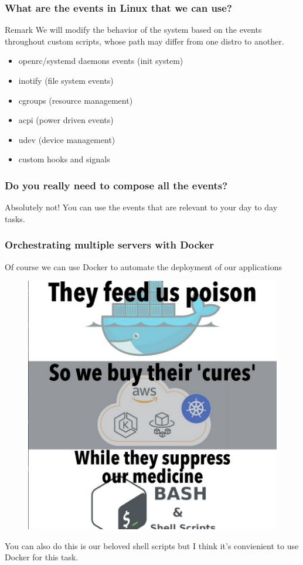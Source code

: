 \documentclass{beamer}
\begin{document}
\begin{frame}
\frametitle{What are the events in Linux that we can use?}
    \small
    \begin{block}{Remark}
        We will modify the behavior of the system based on the events throughout
        custom scripts, whose path may differ from one distro to another.
    \end{block}
    \begin{itemize}
        \item openrc/systemd daemons events (init system)
        \item inotify (file system events)
        \item cgroups (resource management)
        \item acpi (power driven events)
        \item udev (device management)
        \item custom hooks and signals
    \end{itemize}
\end{frame}

\begin{frame}
    \frametitle{Do you really need to compose all the events?}
    \small
    Absolutely not! \newline
    You can use the events that are relevant to your day to day tasks. \newline
\end{frame}
\begin{frame}
    \frametitle{Orchestrating multiple servers with Docker}
    \small
    Of course we can use Docker to automate the deployment of our applications
    \begin{figure}
        \includegraphics[width=0.4\linewidth] {bash_poison}
        \label{fig:bash_poison}
    \end{figure}
    \footnotesize You can also do this is our beloved shell scripts but I think
    it's convienient to use Docker for this task.
\end{frame}
\end{document}
